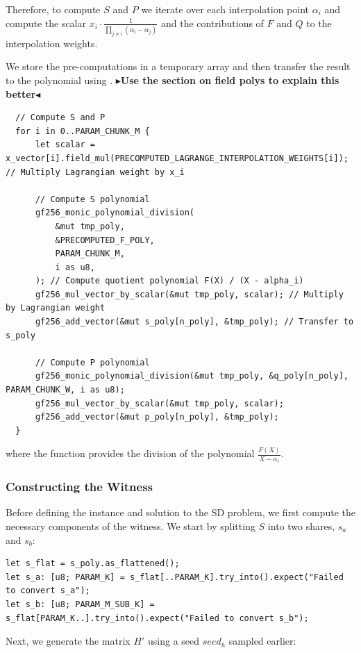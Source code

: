 \documentclass[11pt]{report}
\theoremstyle{definition}
\theoremstyle{plain}
\newcommand{\todo}[1]{{\color[rgb]{.5,0,0}\textbf{$\blacktriangleright$#1$\blacktriangleleft$}}}
\begin{document}
Therefore, to compute $S$ and $P$ we iterate over each interpolation point $\alpha_i$ and compute the scalar $x_i \cdot \frac{1}{\prod_{j\neq i}(\alpha_i - \alpha_j)}$ and the contributions of $F$ and $Q$ to the interpolation weights.

We store the pre-computations in a temporary array  and then transfer the result to the polynomial  using .
\todo{Use the section on field polys to explain this better}
\begin{verbatim}
  // Compute S and P
  for i in 0..PARAM_CHUNK_M {
      let scalar = x_vector[i].field_mul(PRECOMPUTED_LAGRANGE_INTERPOLATION_WEIGHTS[i]); // Multiply Lagrangian weight by x_i

      // Compute S polynomial
      gf256_monic_polynomial_division(
          &mut tmp_poly,
          &PRECOMPUTED_F_POLY,
          PARAM_CHUNK_M,
          i as u8,
      ); // Compute quotient polynomial F(X) / (X - alpha_i)
      gf256_mul_vector_by_scalar(&mut tmp_poly, scalar); // Multiply by Lagrangian weight
      gf256_add_vector(&mut s_poly[n_poly], &tmp_poly); // Transfer to s_poly

      // Compute P polynomial
      gf256_monic_polynomial_division(&mut tmp_poly, &q_poly[n_poly], PARAM_CHUNK_W, i as u8);
      gf256_mul_vector_by_scalar(&mut tmp_poly, scalar);
      gf256_add_vector(&mut p_poly[n_poly], &tmp_poly);
  }
\end{verbatim}

where the function  provides the division of the polynomial $\frac{F(X)}{X - \alpha_i}$.

\subsubsection{Constructing the Witness}

Before defining the instance and solution to the SD problem, we first compute the necessary components of the witness. We start by splitting $S$ into two shares, $s_a$ and $s_b$:

\begin{verbatim}
let s_flat = s_poly.as_flattened();
let s_a: [u8; PARAM_K] = s_flat[..PARAM_K].try_into().expect("Failed to convert s_a");
let s_b: [u8; PARAM_M_SUB_K] = s_flat[PARAM_K..].try_into().expect("Failed to convert s_b");
\end{verbatim}

Next, we generate the matrix $H'$ using a seed $seed_h$ sampled earlier:
\end{document}
